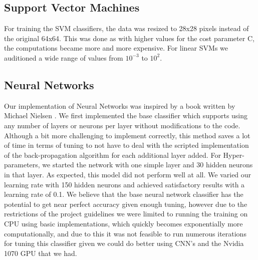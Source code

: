 \documentclass[twoside,twocolumn]{article}
\begin{document}
\subsection{Support Vector Machines}
For training the SVM classifiers, the data was resized to 28x28 pixels instead of the original 64x64. This was done as with higher values for the cost parameter C, the computations became more and more expensive. For linear SVMs we auditioned a wide range of values from $10^{-3}$ to $10^2$. 
\subsection{Neural Networks}
Our implementation of Neural Networks was inspired by a book written by Michael Nielsen \cite{NNBook}. We first implemented the base classifier which supports using any number of layers or neurons per layer without modifications to the code. Although a bit more challenging to implement correctly, this method saves a lot of time in terms of tuning to not have to deal with the scripted implementation of the back-propagation algorithm for each additional layer added. For Hyper-parameters, we started the network with one simple layer and 30 hidden neurons in that layer. As expected, this model did not perform well at all. We varied our learning rate with 150 hidden neurons and achieved satisfactory results with a learning rate of 0.1. We believe that the base neural network classifier has the potential to get near perfect accuracy given enough tuning, however due to the restrictions of the project guidelines we were limited to running the training on CPU using basic implementations, which quickly becomes exponentially more computationally, and due to this it was not feasible to run numerous iterations for tuning this classifier given we could do better using CNN's and the Nvidia 1070 GPU that we had.
\end{document}
